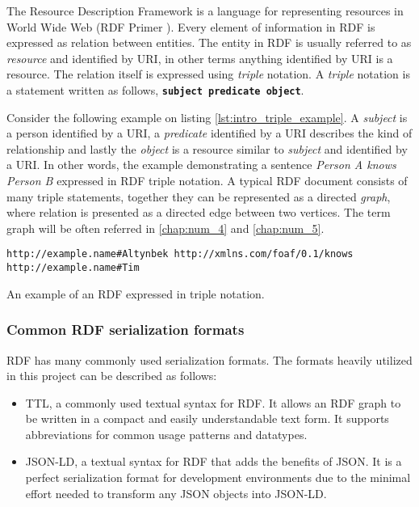 The Resource Description Framework is a language for representing resources in World Wide Web (RDF Primer \cite{Miller:04:RP}). Every element of information in RDF is expressed as relation between entities. The entity in RDF is usually referred to as \textit{resource} and identified by \gls{URI}, in other terms anything identified by URI is a resource. The relation itself is expressed using \textit{triple} notation. A \textit{triple} notation is a statement written as follows, \texttt{\textbf{subject} \textbf{predicate} \textbf{object}}.

Consider the following example on listing \autoref{lst:intro_triple_example}. A \textit{subject} is a person identified by a URI, a \textit{predicate} identified by a URI describes the kind of relationship and lastly the \textit{object} is a resource similar to \textit{subject} and identified by a URI. In other words, the example demonstrating a sentence \textit{Person A knows Person B} expressed in RDF triple notation. A typical RDF document consists of many triple statements, together they can be represented as a directed \textit{graph}, where relation is presented as a directed edge between two vertices. The term graph will be often referred in \autoref{chap:num_4}  and \autoref{chap:num_5}.
 
\begin{listing}[H]    
\begin{verbatim}
http://example.name#Altynbek http://xmlns.com/foaf/0.1/knows http://example.name#Tim
\end{verbatim}
\caption{An example of an RDF expressed in triple notation.} 
\label{lst:intro_triple_example}
\end{listing}

\subsubsection{Common RDF serialization formats}

RDF has many commonly used serialization formats. The formats heavily utilized in this project can be described as follows:
\begin{itemize}
	\item \gls{TTL}, a commonly used textual syntax for RDF. It allows an RDF graph to be written in a compact and easily understandable text form. It supports abbreviations for common usage patterns and datatypes.
	\item \gls{JSON-LD}, a textual syntax for RDF that adds the benefits of JSON. It is a perfect serialization format for development environments due to the minimal effort needed to transform any JSON objects into JSON-LD. 
\end{itemize}

